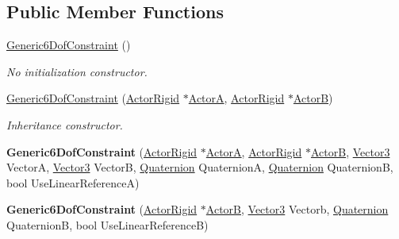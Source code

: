\subsection*{Public Member Functions}
\begin{DoxyCompactItemize}
\item 
\hyperlink{classphys_1_1Generic6DofConstraint_ab897b1d7f04073cae60cf1d2615d04b4}{Generic6DofConstraint} ()
\begin{DoxyCompactList}\small\item\em No initialization constructor. \item\end{DoxyCompactList}\item 
\hyperlink{classphys_1_1Generic6DofConstraint_aae8cea56ac1d384d326a089e48842cbc}{Generic6DofConstraint} (\hyperlink{classphys_1_1ActorRigid}{ActorRigid} $\ast$\hyperlink{classphys_1_1TypedConstraint_a0fefb80c80d433bec9942b851b2f5a8a}{ActorA}, \hyperlink{classphys_1_1ActorRigid}{ActorRigid} $\ast$\hyperlink{classphys_1_1TypedConstraint_a04d2c49698d9a161e92112dd1efc1dcd}{ActorB})
\begin{DoxyCompactList}\small\item\em Inheritance constructor. \item\end{DoxyCompactList}\item 
\hypertarget{classphys_1_1Generic6DofConstraint_abcd2ccd4e4366070f6879119fe2fb985}{
{\bfseries Generic6DofConstraint} (\hyperlink{classphys_1_1ActorRigid}{ActorRigid} $\ast$\hyperlink{classphys_1_1TypedConstraint_a0fefb80c80d433bec9942b851b2f5a8a}{ActorA}, \hyperlink{classphys_1_1ActorRigid}{ActorRigid} $\ast$\hyperlink{classphys_1_1TypedConstraint_a04d2c49698d9a161e92112dd1efc1dcd}{ActorB}, \hyperlink{classphys_1_1Vector3}{Vector3} VectorA, \hyperlink{classphys_1_1Vector3}{Vector3} VectorB, \hyperlink{classphys_1_1Quaternion}{Quaternion} QuaternionA, \hyperlink{classphys_1_1Quaternion}{Quaternion} QuaternionB, bool UseLinearReferenceA)}
\label{de/d2a/classphys_1_1Generic6DofConstraint_abcd2ccd4e4366070f6879119fe2fb985}

\item 
\hypertarget{classphys_1_1Generic6DofConstraint_a4b8b1dc473a133b51d516320a10b70d5}{
{\bfseries Generic6DofConstraint} (\hyperlink{classphys_1_1ActorRigid}{ActorRigid} $\ast$\hyperlink{classphys_1_1TypedConstraint_a04d2c49698d9a161e92112dd1efc1dcd}{ActorB}, \hyperlink{classphys_1_1Vector3}{Vector3} Vectorb, \hyperlink{classphys_1_1Quaternion}{Quaternion} QuaternionB, bool UseLinearReferenceB)}
\label{de/d2a/classphys_1_1Generic6DofConstraint_a4b8b1dc473a133b51d516320a10b70d5}


\end{DoxyCompactItemize}
